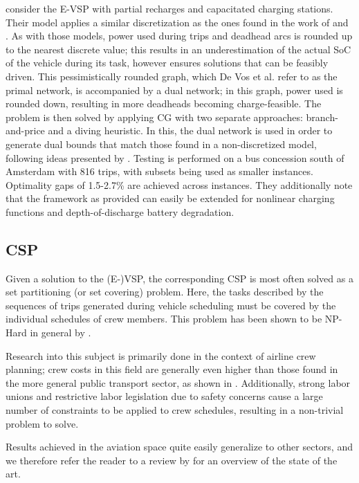 \documentclass[]{article}
\begin{document}
 consider the E-VSP with partial recharges and capacitated charging stations. Their model applies a similar discretization as the ones found in the work of \citet{vanKootenNiekerk2017} and \citet{Zhang2021}. As with those models, power used during trips and deadhead arcs is rounded up to the nearest discrete value; this results in an underestimation of the actual SoC of the vehicle during its task, however ensures solutions that can be feasibly driven. This pessimistically rounded graph, which De Vos et al. refer to as the primal network, is accompanied by a dual network; in this graph, power used is rounded down, resulting in more deadheads becoming charge-feasible. The problem is then solved by applying CG with two separate approaches: branch-and-price and a diving heuristic. In this, the dual network is used in order to generate dual bounds that match those found in a non-discretized model, following ideas presented by \citet{Boland2017}. Testing is performed on a bus concession south of Amsterdam with 816 trips, with subsets being used as smaller instances. Optimality gaps of 1.5-2.7\% are achieved across instances. They additionally note that the framework as provided can easily be extended for nonlinear charging functions and depth-of-discharge battery degradation. 

\subsection{CSP}
Given a solution to the (E-)VSP, the corresponding CSP is most often solved as a set partitioning (or set covering) problem. Here, the tasks described by the sequences of trips generated during vehicle scheduling must be covered by the individual schedules of crew members. This problem has been shown to be NP-Hard in general by \citet{Fischetti1989}.

Research into this subject is primarily done in the context of airline crew planning; crew costs in this field are generally even higher than those found in the more general public transport sector, as shown in \citet{Barnhart2003}. Additionally, strong labor unions and restrictive labor legislation due to safety concerns cause a large number of constraints to be applied to crew schedules, resulting in a non-trivial problem to solve.

Results achieved in the aviation space quite easily generalize to other sectors, and we therefore refer the reader to a review by \citet{Wen2021} for an overview of the state of the art. 
\end{document}
